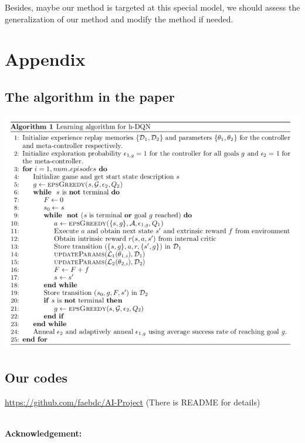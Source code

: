 \documentclass{article}
\newcommand{\Acknowledgement}[1]{\ \\{\bf Acknowledgement:} #1}
\begin{document}
\begin{spacing}{1.1}
    Besides, maybe our method is targeted at this special model, we should assess the generalization of our method and modify the method if needed.


    \section*{Appendix}

    \subsection*{The algorithm in the paper}
    \begin{center}
        \includegraphics[width = \textwidth]{pseudo.png}
    \end{center}

    \subsection*{Our codes}
    \url{https://github.com/faebdc/AI-Project}
    (There is README for details)

    
    

    \Acknowledgement{}


    \end{spacing}
    
\end{document}
